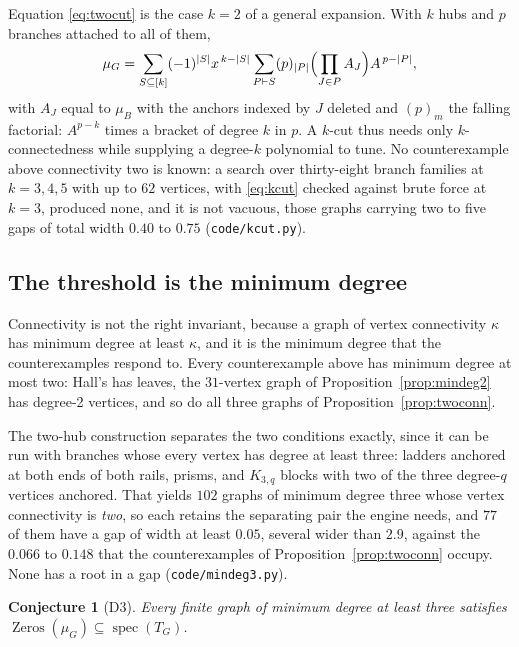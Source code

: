 \documentclass[11pt]{article}
\newtheorem{conjecture}[theorem]{Conjecture}
\theoremstyle{remark}
\begin{document}
Equation \eqref{eq:twocut} is the case $k=2$ of a general expansion. With $k$ hubs and $p$
branches attached to all of them,
\begin{equation}\label{eq:kcut}
   \mu_G=\sum_{S\subseteq[k]}(-1)^{|S|}x^{\,k-|S|}
        \sum_{P\vdash S}(p)_{|P|}\Bigl(\prod_{J\in P}A_J\Bigr)A^{\,p-|P|},
\end{equation}
with $A_J$ equal to $\mu_B$ with the anchors indexed by $J$ deleted and $(p)_m$ the falling
factorial: $A^{p-k}$ times a bracket of degree $k$ in $p$. A $k$-cut thus needs only
$k$-connectedness while supplying a degree-$k$ polynomial to tune. No counterexample above
connectivity two is known: a search over thirty-eight branch families at $k=3,4,5$ with up to
$62$ vertices, with \eqref{eq:kcut} checked against brute force at $k=3$, produced none, and it
is not vacuous, those graphs carrying two to five gaps of total width $0.40$ to $0.75$
(\texttt{code/kcut.py}).

\subsection{The threshold is the minimum degree}\label{sec:mindeg3}

Connectivity is not the right invariant, because a graph of vertex connectivity $\kappa$ has
minimum degree at least $\kappa$, and it is the minimum degree that the counterexamples respond
to. Every counterexample above has minimum degree at most two: Hall's has leaves, the
$31$-vertex graph of Proposition~\ref{prop:mindeg2} has degree-2 vertices, and so do all three
graphs of Proposition~\ref{prop:twoconn}.

The two-hub construction separates the two conditions exactly, since it can be run with branches
whose every vertex has degree at least three: ladders anchored at both ends of both rails,
prisms, and $K_{3,q}$ blocks with two of the three degree-$q$ vertices anchored. That yields
$102$ graphs of minimum degree three whose vertex connectivity is \emph{two}, so each retains the
separating pair the engine needs, and $77$ of them have a gap of width at least $0.05$, several
wider than $2.9$, against the $0.066$ to $0.148$ that the counterexamples of
Proposition~\ref{prop:twoconn} occupy. None has a root in a gap (\texttt{code/mindeg3.py}).

\begin{conjecture}[D3]\label{conj:mindeg3}
Every finite graph of minimum degree at least three satisfies
$\operatorname{Zeros}(\mu_G)\subseteq\operatorname{spec}(T_G)$.
\end{conjecture}
\end{document}
